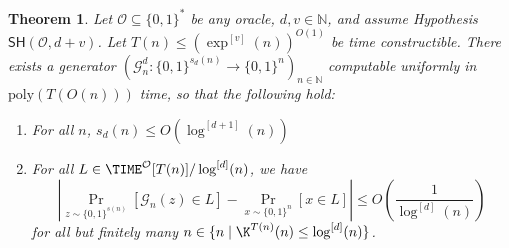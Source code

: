 \documentclass[11pt]{article}
\newtheorem{theorem}{Theorem}
\newcommand{\B}{\{0,1\}}
\newcommand{\SH}{\mathsf{SH}}
\renewcommand{\poly}{\mathrm{poly}}
\begin{document}
\begin{theorem}\label{thm:elementary-generator}
Let $\mathcal{O} \subseteq \B^*$ be any oracle, $d, v\in \mathbb{N}$, and assume Hypothesis $\SH(\mathcal{O},d+v)$. Let $T(n) \leq (\exp^{[v]}(n))^{O(1)}$ be time constructible. There exists a generator $(\mathcal{G}^d_n: \B^{s_d(n)} \to \B^n)_{n \in \mathbb{N}}$ computable uniformly in $\poly(T(O(n)))$ time, so that the following hold:
\begin{enumerate}
	\item For all $n$, $s_d(n) \leq  O(\log^{[d+1]}(n))$
	\item For all $L \in \TIME^\mathcal{O}[T(n)]/\log^{[d]}(n)$, we have
	\[
	|\Pr_{z \sim \B^{s(n)}}[\mathcal{G}_n(z) \in L] - \Pr_{x \sim \B^n}[x \in L]| \leq O(\frac{1}{\log^{[d]}(n)})
	\]
	for all but finitely many $n\in \{n \mid \K^{T(n)}(n) \leq \log^{[d]}(n)\}$.
\end{enumerate}
\end{theorem}
\end{document}
